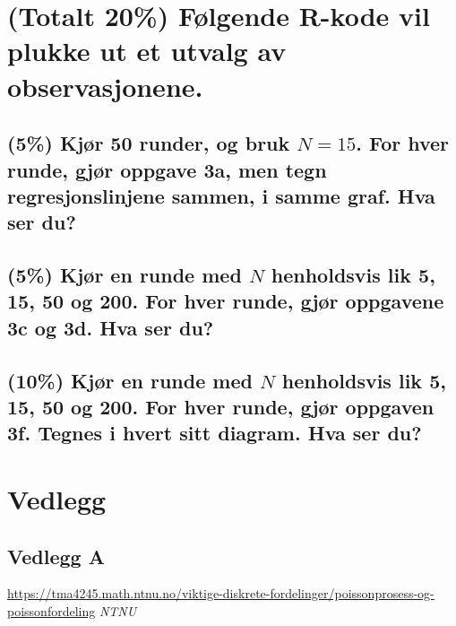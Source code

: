 \documentclass[12pt]{article}
\begin{document}
\section{(Totalt 20\%) Følgende R-kode vil plukke ut et utvalg av observasjonene.}
\subsection{(5\%) Kjør 50 runder, og bruk $N = 15$. For hver runde, gjør oppgave 3a, men tegn regresjonslinjene sammen, i samme graf. Hva ser du?}
\subsection{(5\%) Kjør en runde med $N$ henholdsvis lik 5, 15, 50 og 200. For hver runde, gjør oppgavene 3c og 3d. Hva ser du?}
\subsection{(10\%) Kjør en runde med $N$ henholdsvis lik 5, 15, 50 og 200. For hver runde, gjør oppgaven 3f. Tegnes i hvert sitt diagram. Hva ser du?}

\newpage
\section*{Vedlegg}
\subsection*{Vedlegg A}

\newpage
\begin{thebibliography}{9}

  \url{https://tma4245.math.ntnu.no/viktige-diskrete-fordelinger/poissonprosess-og-poissonfordeling}
  \textit{NTNU}
\end{thebibliography}
\end{document}
